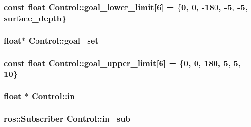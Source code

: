 \subsubsection[{\texorpdfstring{goal\+\_\+lower\+\_\+limit}{goal_lower_limit}}]{\setlength{\rightskip}{0pt plus 5cm}const float Control\+::goal\+\_\+lower\+\_\+limit\mbox{[}6\mbox{]} = \{0, 0, -\/180, -\/5, -\/5, {\bf surface\+\_\+depth}\}\hspace{0.3cm}{\ttfamily [private]}}\hypertarget{classControl_ae28212c8997ed67f06e82356f8a5e67a}{}\label{classControl_ae28212c8997ed67f06e82356f8a5e67a}
\subsubsection[{\texorpdfstring{goal\+\_\+set}{goal_set}}]{\setlength{\rightskip}{0pt plus 5cm}float$\ast$ Control\+::goal\+\_\+set\hspace{0.3cm}{\ttfamily [private]}}\hypertarget{classControl_ac7a1ee49d8d049924d680f393b43842b}{}\label{classControl_ac7a1ee49d8d049924d680f393b43842b}
\subsubsection[{\texorpdfstring{goal\+\_\+upper\+\_\+limit}{goal_upper_limit}}]{\setlength{\rightskip}{0pt plus 5cm}const float Control\+::goal\+\_\+upper\+\_\+limit\mbox{[}6\mbox{]} = \{0, 0, 180, 5, 5, 10\}\hspace{0.3cm}{\ttfamily [private]}}\hypertarget{classControl_a3ec640ae9e440c49fe6c917597487856}{}\label{classControl_a3ec640ae9e440c49fe6c917597487856}
\subsubsection[{\texorpdfstring{in}{in}}]{\setlength{\rightskip}{0pt plus 5cm}float $\ast$ Control\+::in\hspace{0.3cm}{\ttfamily [private]}}\hypertarget{classControl_a76848f8d74014150f7fa48c9c76f9942}{}\label{classControl_a76848f8d74014150f7fa48c9c76f9942}
\subsubsection[{\texorpdfstring{in\+\_\+sub}{in_sub}}]{\setlength{\rightskip}{0pt plus 5cm}ros\+::\+Subscriber Control\+::in\+\_\+sub\hspace{0.3cm}{\ttfamily [private]}}\hypertarget{classControl_a0aa8e9ce906bd50de463b07fce71f7b8}{}\label{classControl_a0aa8e9ce906bd50de463b07fce71f7b8}
